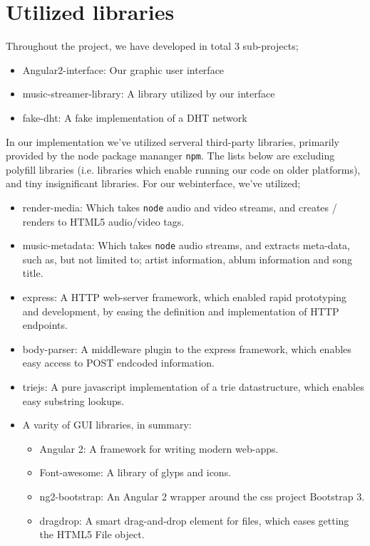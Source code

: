 \section{Utilized libraries}
\label{sec:libraries}
Throughout the project, we have developed in total 3 sub-projects;
\begin{itemize}
\item Angular2-interface: Our graphic user interface
\item music-streamer-library: A library utilized by our interface
\item fake-dht: A fake implementation of a \acs{DHT} network
\end{itemize}
In our implementation we've utilized serveral third-party libraries, primarily
provided by the node package mananger \verb|npm|. The lists below are excluding
polyfill libraries (i.e. libraries which enable running our code on older
platforms), and tiny insignificant libraries.
\newline\newline
For our webinterface, we've utilized;
\begin{itemize}
\item render-media: Which takes \verb|node| audio and video streams, and
        creates / renders to \acs{HTML}5 audio/video tags.
\item music-metadata: Which takes \verb|node| audio streams, and extracts
        meta-data, such as, but not limited to; artist information, ablum 
        information and song title.
\item express: A \acs{HTTP} web-server framework, which enabled rapid prototyping and
        development, by easing the definition and implementation of \acs{HTTP} endpoints.
\item body-parser: A middleware plugin to the express framework, which enables 
        easy access to POST endcoded information.
\item triejs: A pure javascript implementation of a trie datastructure, which 
        enables easy substring lookups.
\item A varity of \acs{GUI} libraries, in summary:
    \begin{itemize}
    \item Angular 2: A framework for writing modern web-apps.
    \item Font-awesome: A library of glyps and icons.
    \item ng2-bootstrap: An Angular 2 wrapper around the css project Bootstrap 3.
    \item dragdrop: A smart drag-and-drop element for files, which eases getting
            the \acs{HTML}5 File object.
    \end{itemize}
\end{itemize}
